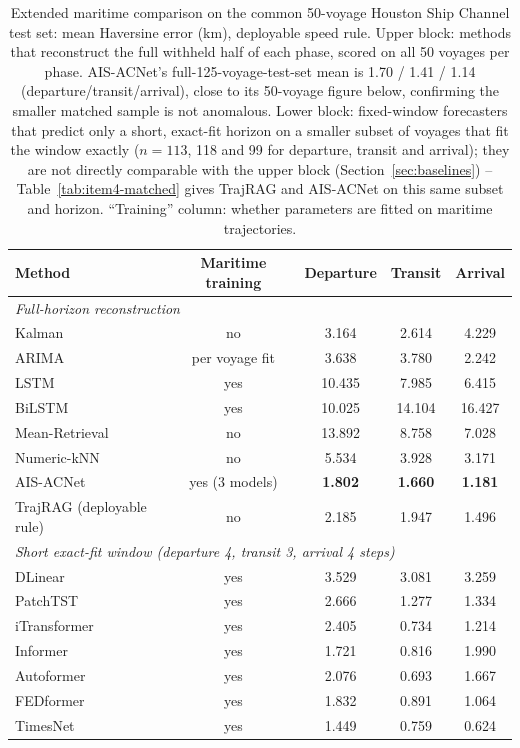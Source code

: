 \begin{table}[t]
\centering
\caption{Extended maritime comparison on the common 50-voyage Houston Ship
Channel test set: mean Haversine error (km), deployable speed rule. Upper
block: methods that reconstruct the full withheld half of each phase,
scored on all 50 voyages per phase. AIS-ACNet's full-125-voyage-test-set
mean is 1.70 / 1.41 / 1.14 (departure/transit/arrival), close to its
50-voyage figure below, confirming the smaller matched sample is not
anomalous. Lower block: fixed-window forecasters that predict only a short,
exact-fit horizon on a smaller subset of voyages that fit the window
exactly ($n=113$, 118 and 99 for departure, transit and arrival); they are
not directly comparable with the upper block (Section~\ref{sec:baselines}) --
Table~\ref{tab:item4-matched} gives TrajRAG and AIS-ACNet on this same
subset and horizon. ``Training'' column: whether parameters are fitted on
maritime trajectories.}
\label{tab:extended}
\footnotesize
\setlength{\tabcolsep}{4pt}
\begin{tabular}{lcccc}
\toprule
Method & Maritime training & Departure & Transit & Arrival \\
\midrule
\multicolumn{5}{l}{\emph{Full-horizon reconstruction}} \\
Kalman & no & 3.164 & 2.614 & 4.229 \\
ARIMA & per voyage fit & 3.638 & 3.780 & 2.242 \\
LSTM & yes & 10.435 & 7.985 & 6.415 \\
BiLSTM & yes & 10.025 & 14.104 & 16.427 \\
Mean-Retrieval & no & 13.892 & 8.758 & 7.028 \\
Numeric-kNN & no & 5.534 & 3.928 & 3.171 \\
AIS-ACNet \citep{shin2024aisacnet} & yes (3 models) & \textbf{1.802} & \textbf{1.660} & \textbf{1.181} \\
TrajRAG (deployable rule) & no & 2.185 & 1.947 & 1.496 \\
\midrule
\multicolumn{5}{l}{\emph{Short exact-fit window (departure 4, transit 3, arrival 4 steps)}} \\
DLinear & yes & 3.529 & 3.081 & 3.259 \\
PatchTST & yes & 2.666 & 1.277 & 1.334 \\
iTransformer & yes & 2.405 & 0.734 & 1.214 \\
Informer & yes & 1.721 & 0.816 & 1.990 \\
Autoformer & yes & 2.076 & 0.693 & 1.667 \\
FEDformer & yes & 1.832 & 0.891 & 1.064 \\
TimesNet & yes & 1.449 & 0.759 & 0.624 \\
\bottomrule
\end{tabular}
\end{table}


